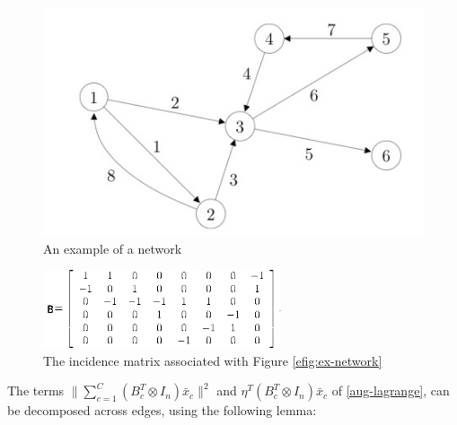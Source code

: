 \documentclass{article}
\begin{document}
\begin{figure}[h]
\centering
\includegraphics[height = 5 cm]{network-ex-incidence-mat.jpg}
\caption{An example of a network}
\label{efig:ex-network}
\end{figure}

\begin{figure}[h]
\centering
\includegraphics[height = 3 cm, width = 7cm]{ex-incidencematrix1.png}
\caption{The incidence matrix associated with Figure \eqref{efig:ex-network}}
\label{fig:incidence-matrix}
\end{figure}

The terms \(\|\sum_{c=1}^C\left(B_c^T \otimes I_n\right)\bar{x}_c\|^2\) and \( \eta^T\left(B_c^T \otimes I_n\right)\bar{x}_c \) of \eqref{aug-lagrange}, can be decomposed across edges, using the following lemma:
\end{document}
